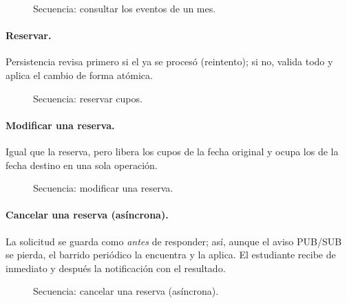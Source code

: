 \begin{figure}[H]
    \centering
    \secuenciaConsultar
    \caption{Secuencia: consultar los eventos de un mes.}
\end{figure}

\paragraph{Reservar.} Persistencia revisa primero si el  ya se
procesó (reintento); si no, valida todo y aplica el cambio de forma atómica.

\begin{figure}[H]
    \centering
    \resizebox{\textwidth}{!}{\secuenciaReservar}
    \caption{Secuencia: reservar cupos.}
\end{figure}

\paragraph{Modificar una reserva.} Igual que la reserva, pero libera los cupos de la
fecha original y ocupa los de la fecha destino en una sola operación.

\begin{figure}[H]
    \centering
    \resizebox{\textwidth}{!}{\secuenciaModificar}
    \caption{Secuencia: modificar una reserva.}
\end{figure}

\paragraph{Cancelar una reserva (asíncrona).} La solicitud se guarda como
 \emph{antes} de responder; así, aunque el aviso PUB/SUB se
pierda, el barrido periódico la encuentra y la aplica. El estudiante recibe de
inmediato  y después la notificación con el resultado.

\begin{figure}[H]
    \centering
    \resizebox{\textwidth}{!}{\secuenciaCancelar}
    \caption{Secuencia: cancelar una reserva (asíncrona).}
\end{figure}
